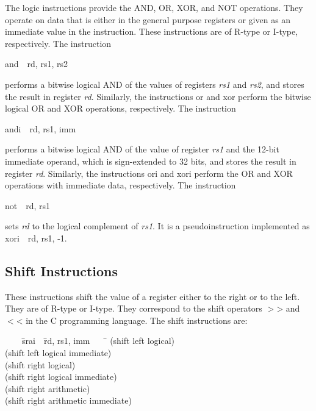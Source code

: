 \documentclass[11pt, twoside, pdftex]{article}
\newenvironment{ctabbing}%
{\begin{center}\begin{minipage}{\textwidth}\begin{tabbing}}
{\end{tabbing}\end{minipage}\end{center}}
\begin{document}
The logic instructions provide the AND, OR, XOR, and NOT operations. They operate on data
that is either in the general purpose registers or given as an immediate value in the instruction. 
These instructions are of R-type or I-type, respectively.  The instruction
\vspace{-\baselineskip}
\begin{center}
{\sf and~~rd, rs1, rs2} 
\end{center}
\noindent
performs a bitwise logical AND of the values of registers {\it rs1} and {\it rs2}, and stores 
the result in register {\it rd}. Similarly, the instructions {\sf or} and {\sf xor}
perform the bitwise logical OR and XOR operations, respectively.  The instruction
\vspace{-\baselineskip}
\begin{center}
{\sf andi~~rd, rs1, imm} 
\end{center}
\noindent
performs a bitwise logical AND of the value of register {\it rs1} and the 12-bit immediate
operand, which is sign-extended to 32 bits, and stores the result in register {\it rd}.
Similarly, the instructions {\sf ori} and {\sf xori} perform the OR and XOR operations 
with immediate data, respectively.
The instruction
\vspace{-\baselineskip}
\begin{center}
{\sf not~~rd, rs1} 
\end{center}
\noindent
sets {\it rd} to the logical complement of {\it rs1}. It is a pseudoinstruction
implemented as {\sf xori~~rd, rs1, -1}.
\subsection{Shift Instructions}

These instructions shift the value of a register either to the right or to the left.
They are of R-type or I-type. They correspond to the shift operators $>$> and $<$< in the C 
programming language. 
\newpage
The shift instructions are:
\vspace{-\baselineskip}
\begin{ctabbing}
~~~~\={\sf srai}~~\={\sf rd, rs1, imm}~~~~\=\kill
{}  \>(shift left logical)\\
  \>(shift left logical immediate)\\
  \>(shift right logical)\\
  \>(shift right logical immediate)\\
  \>(shift right arithmetic)\\
  \>(shift right arithmetic immediate)
\end{ctabbing}
\end{document}
